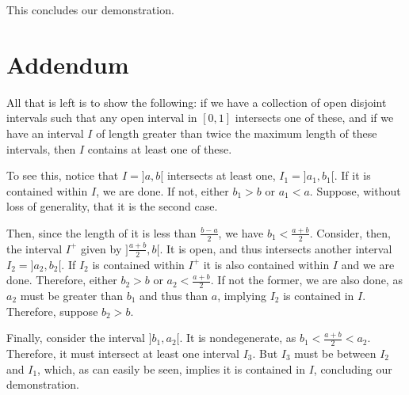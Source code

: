 \documentclass{article}
\begin{document}
	This concludes our demonstration.
	
	\section{Addendum}
	
	All that is left is to show the following: if we have a collection of open disjoint intervals such that any open interval in $[0,1]$ intersects one of these, and if we have an interval $I$ of length greater than twice the maximum length of these intervals, then $I$ contains at least one of these.
	
	To see this, notice that $I = ]a,b[$ intersects at least one, $I_1 = ]a_1, b_1[$. If it is contained within $I$, we are done. If not, either $b_1 > b$ or $a_1 < a$. Suppose, without loss of generality, that it is the second case.
	
	Then, since the length of it is less than $\frac{b-a}2$, we have $b_1 < \frac{a+b}2$. Consider, then, the interval $I^+$ given by $]\frac{a+b}2, b[$. It is open, and thus intersects another interval $I_2 = ]a_2, b_2[$. If $I_2$ is contained within $I^+$ it is also contained within $I$ and we are done. Therefore, either $b_2 > b$ or $a_2 < \frac{a+b}2$. If not the former, we are also done, as $a_2$ must be greater than $b_1$ and thus than $a$, implying $I_2$ is contained in $I$. Therefore, suppose $b_2 > b$.
	
	Finally, consider the interval $]b_1, a_2[$. It is nondegenerate, as $b_1 < \frac{a+b}2 < a_2$. Therefore, it must intersect at least one interval $I_3$. But $I_3$ must be between $I_2$ and $I_1$, which, as can easily be seen, implies it is contained in $I$, concluding our demonstration.
\end{document}

